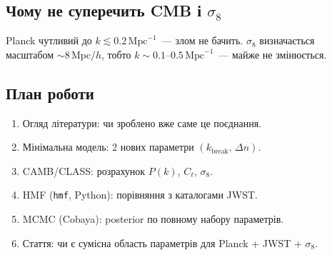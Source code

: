 \documentclass[12pt, a4paper]{article}
\begin{document}
\subsection{Чому не суперечить CMB і $\sigma_8$}

Planck чутливий до $k \lesssim 0.2\,\mathrm{Mpc}^{-1}$~--- злом не бачить.
$\sigma_8$ визначається масштабом $\sim 8\,\mathrm{Mpc}/h$, тобто
$k \sim 0.1$--$0.5\,\mathrm{Mpc}^{-1}$~--- майже не змінюється.

\subsection{План роботи}

\begin{enumerate}
  \item Огляд літератури: чи зроблено вже саме це поєднання.
  \item Мінімальна модель: 2 нових параметри $(k_\mathrm{break},\, \Delta n)$.
  \item CAMB/CLASS: розрахунок $P(k)$, $C_\ell$, $\sigma_8$.
  \item HMF (\texttt{hmf}, Python): порівняння з каталогами JWST.
  \item MCMC (Cobaya): posterior по повному набору параметрів.
  \item Стаття: чи є сумісна область параметрів для Planck + JWST + $\sigma_8$.
\end{enumerate}


\printbibliography
\end{document}
